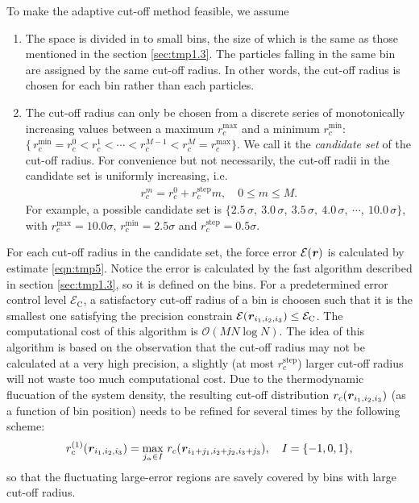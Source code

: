 \documentclass[aps,pre,preprint]{revtex4-1}
\renewcommand{\v}[1]{\textbf{\textit{#1}}}
\begin{document}
To make the adaptive cut-off method feasible, we assume
\begin{enumerate}
\item The space is divided in to small bins, the size of which is the
  same as those mentioned in the section \ref{sec:tmp1.3}.  The
  particles falling in the same bin are assigned by the same cut-off
  radius. In other words, the cut-off radius is chosen for each bin
  rather than each particles.
\item The cut-off radius can only be chosen from a discrete series of
  monotonically increasing values between a maximum 
  $r_c^{\textrm{max}}$ and a minimum 
  $r_c^{\textrm{min}}$: $\{\,r_c^{\textrm{min}} = r_c^0 < r_c^1 <
  \cdots < r_c^{M-1} <r_c^M = r_c^{\textrm{max}}\}$.  We call it the
  \emph{candidate set} of the cut-off radius.  For convenience but not
  necessarily, the cut-off radii in the candidate set is uniformly increasing, i.e.
  \begin{align}
    r_c^m = r_c^0 + r_c^{\textrm{step}} m, \quad 0 \leq m \leq M.
  \end{align}
  For example, a possible candidate set is $\{2.5\,\sigma,\
  3.0\,\sigma,\ 3.5\,\sigma,\ 4.0\,\sigma,\ \cdots,\ 10.0\,\sigma\}$,
  with $r_c^{\textrm{max}} = 10.0\sigma$, $r_c^{\textrm{min}} =
  2.5\sigma$ and $r_c^{\textrm{step}} = 0.5 \sigma$.
\end{enumerate}
For each cut-off radius in the candidate set, the force error
$\mathcal E(\v r)$ is calculated by estimate
\eqref{eqn:tmp5}. Notice the error is calculated by the
fast algorithm described in section \ref{sec:tmp1.3}, so it is
defined on the bins.  For a predetermined error control level
$\mathcal E_{\textrm{C}}$, a satisfactory cut-off radius of a bin is
choosen such that it is the smallest one satisfying the precision
constrain $\mathcal E(\v r_{i_1,i_2,i_3}) \leq \mathcal
E_{\textrm{C}}$. The computational cost of this algorithm is $\mathcal
O(MN\log N)$.  The idea of this algorithm is based on the observation
that the cut-off radius may not be calculated at a very high
precision, a slightly (at most $r_c^{\textrm{step}}$) larger
cut-off radius will not waste too much computational cost.  Due to the
thermodynamic flucuation of the system density, the resulting cut-off
distribution $r_c(\v r_{i_1,i_2,i_3})$ (as a function of bin
position) needs to be refined for several times by the following scheme:
\begin{align}\label{eqn:rc-refine}
  r^{(1)}_c(\v r_{i_1,i_2,i_3}) = \max_{j_\alpha\in I}\,r_c(\v r_{i_1+j_1,i_2+j_2,i_3+j_3}),
  \quad I = \{-1, 0, 1\},
\end{align}
so that the fluctuating large-error regions are savely covered by bins
with large cut-off radius.
\end{document}
